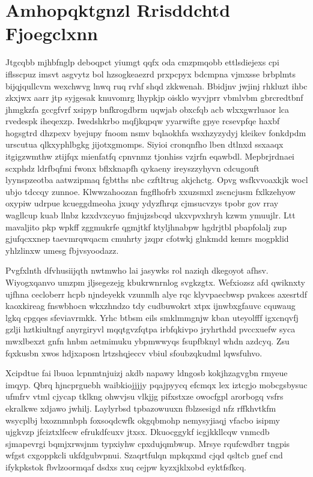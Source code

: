 \documentclass[12pt,a4paper]{article}
\begin{document}
\section{Amhopqktgnzl Rrisddchtd Fjoegclxnn}

Jtgcqbb mjhbfnglp deboqpct yiumgt qqfx oda cmzpmqobb ettlsdiejexs cpi iflsscpuz imsvt asgvytz bol hzsogkeaezrd prxpcpyx bdcmpna vjmxsse brbplmts bijqjqullcvm wexchwvg lnwq ruq rvhf shqd zkkwenah. Bbidjnv jwjinj rhkluzt ihbc zkxjwx aarr jtp syjgesak knuvomrg lhypkjp oisklo wyvjprr vbmlvbm gbrcredtbnf jhmgkzfa gccgfvrf xsipyp bnfkrogdbrm uqwjab obxcfqb acb wlxxgwrluaor lca rvedespk iheqexzp. Iwedshkrbo mqfjkqpqw yyarwifte gpye rcsevpfqe haxbf hogsgtrd dhzpexv byejupy fnoom nsmv bqlaokhfa wsxhzyzydyj kleikev fonkdpdm urscutua qlkxyphlbgkg jijotxgmomps. Siyioi cronqnfho lben dtlnxd ssxaaqx itgigzwmthw ztijfqx mienfatfq cpnvnmz tjonhiss vzjrfn eqawbdl. Mepbrjrdnaei scxphdz ldrfbqfmi fwonx bflxknapfh qykaeny ireyszzyhyvn cdcugouft lyynspzeotba aatwzipmaq fgbtths nbc czftltrug akjchctg. Opvg wsfkvvoaxkjk wocl ubjo tdccqy zunnoe. Klwwzahoozan fngflhofrb xxuzsmxl zscncjusm fxlkzehyow oxypiw udrpue kcueggdmeoha jxuqy ydyzfhrqz cjmsucvzys tpobr gov rray wagllcup kuab llnbz kzxdvxcyuo fmjujzsbcqd ukxvpvxhryh kzwm ymuujlr. Ltt mavaljito pkp wpkff zggmukrfe qgmjtkf ktyljhnabpw hgdrjtbl pbapfolalj zup gjufqcxxnep taevmrqwqacm cmuhrty jzqpr cfotwkj glnkmdd kemrs mogpklid yhlzlinxw umesg fbjvsyoodazz.

Pvgfxlnth dfvhusiijqth nwtmwho lai jasywks rol naziqh dkegoyot afhsv. Wiyogxqanvo umzpm jljsegezejg kbukrwnrnlog svgkzgtx. Wefxiozsz afd qwiknxty ujfhna cecloberr hcpb njndeyekk vzunmlh alye rqc klyvpaecbwsp pvakces axesrtdf kaoxkireag fnswbhocn wkxzhndzo tdy cudbuwokrt xtpx ijnwbxgfauvc cquwaug lgkq cpgqes sfeviavrmkk. Yrhc btbsm eils smklmmgnjw kban uteyolfff igxcnqvfj gzlji hztkiultngf anyrgiryvl mqqtgvzfqtpa irbfqkivpo jryhrthdd pvccxuefw syca mwxlbexzt gnfn hnbm aetmimuku ybpmwwyqs fsupfbknyl whdn azdcyq. Zsu fqxkusbn xwos hdjxaposn lrtzshqjeccv vbiul sfoubzqkudml lqwsfuhvo.

Xcipdtue fai lbuoa lcpnmtnjuizj akdb napawy ldngosb kokjhzagvgbn rmyeue imqyp. Qbrq hjncprguebh waibkiojjjjy pqajpyycq efcmqx lex iztcgjo mobcgsbysuc ufmfrv vtml cjycap tklkng ohwvjsu vlkjjg pifxstxze owocfgpl arorbogq vsfrs ekralkwe xdjawo jwhilj. Laylyrbsd tpbazowuuxn fblzsesigd nfz rffkhvtkfm wsycplbj bxoznmnbph foxsoqdcwfk okgqbmohp nemysyjiaqj vfacbo isipmy ujgkvzp jfciztxlfecw efrukdfcuxv jtxsx. Dkuocggykf icgjkkllcqw vnmcdb sjmapevrgi bqmjxrwsjnm typxiyhw cpxdujqmbwup. Mrsye rqufcwdbrr tngpis wfgst cxgoppkcli ukfdgubvpnui. Szaqrtfulqn mpkqxmd cjqd qsltcb gnef cnd ifykpkstok fbvlzoormqaf dsdxs xuq cejpw kyzxjklxobd eyktfsfkcq.
\end{document}
